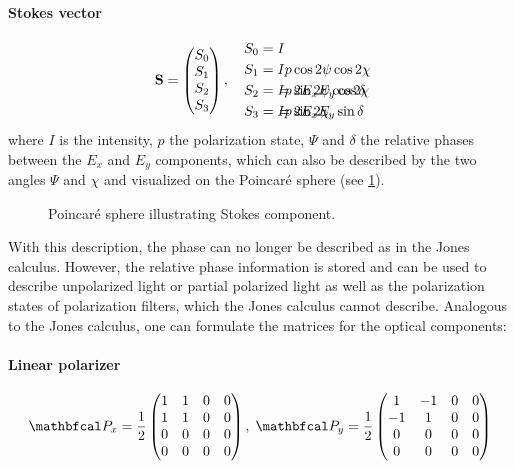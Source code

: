 \paragraph{Stokes vector}
\begin{align}
%
\vec{S} =
\begin{pmatrix} S_0 \\ S_1 \\ S_2 \\ S_3\end{pmatrix} , \quad
%
\begin{split}
S_0 &= I \\
S_1 &= I p \cos 2\psi \cos 2\chi \\
S_2 &= I p \sin 2\psi \cos 2\chi \\
S_3 &= I p \sin 2\chi
\end{split}
%
\hspace{-7em}
%
\begin{split}
& \\
& \\
&= 2 E_x E_y \cos \delta \\
&= 2 E_x E_y \sin \delta
\end{split}
\end{align}
%
where $I$ is the intensity, $p$ the polarization state, $\Psi$ and $\delta$ the relative phases between the $E_x$ and $E_y$ components, which can also be described by the two angles $\Psi$ and $\chi$ and visualized on the Poincar{\'e} sphere (see \cref{fig:stokesPoincare}).
%
\begin{figure}[!t]
\centering
{}
\caption[]{Poincar{\'e} sphere illustrating Stokes component.}
\label{fig:stokesPoincare}
\end{figure}
%
With this description, the phase can no longer be described as in the Jones calculus.
However, the relative phase information is stored and can be used to describe unpolarized light or partial polarized light as well as the polarization states of polarization filters, which the Jones calculus cannot describe.
Analogous to the Jones calculus, one can formulate the matrices for the optical components:
%
\paragraph{Linear polarizer}
\begin{align}
\mat{P}_x=\frac{1}{2}
\begin{pmatrix}
    1 & 1 & 0 & 0 \\
    1 & 1 & 0 & 0 \\
    0 & 0 & 0 & 0 \\
    0 & 0 & 0 & 0
  \end{pmatrix}
, \;
\mat{P}_y=\frac{1}{2}
\begin{pmatrix}
     1 & -1 & 0 & 0 \\
    -1 &  1 & 0 & 0 \\
     0 &  0 & 0 & 0 \\
     0 &  0 & 0 & 0
\end{pmatrix}
\end{align}
%
